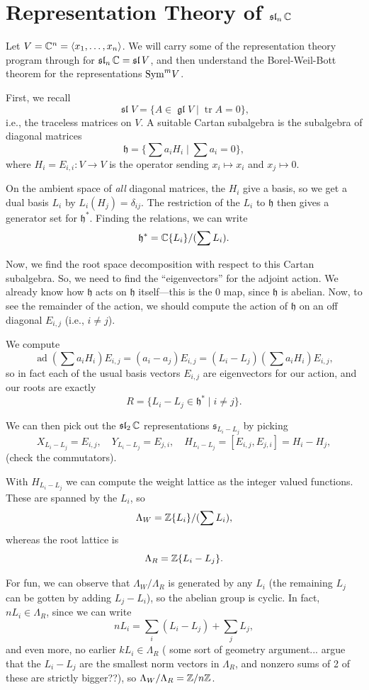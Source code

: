 \documentclass[12pt]{article}
\newcommand{\fh}{\mathfrak{h}}
\newcommand{\gl}{\operatorname{\mathfrak{gl}}}
\newcommand{\fs}{\mathfrak{s}}
\DeclareMathOperator{\ad}{ad}
\newcommand{\fsl}{\operatorname{\mathfrak{sl}}}
\DeclareMathOperator{\tr}{tr}
\begin{document}
\section{Representation Theory of $\fsl_n \C$}

Let $V=\mathbb{C}^n = \left\langle x_1,\dots,x_n\right\rangle$. We will carry some of the representation theory program through for $\fsl_n \C = \fsl V$, and then understand the Borel-Weil-Bott theorem for the representations $\mathrm{Sym}^m V$.

First, we recall
\[\fsl V = \{A\in \gl V \mid \tr A = 0\},\]
i.e., the traceless matrices on $V$. A suitable Cartan subalgebra is the subalgebra of diagonal matrices
\[\fh = \{\sum a_i H_i \mid \sum a_i = 0\},\]
where $H_i=E_{i,i}: V\to V$ is the operator sending $x_i\mapsto x_i$ and $x_j\mapsto 0$.

On the ambient space of \textit{all} diagonal matrices, the $H_i$ give a basis, so we get a dual basis $L_i$ by $L_i(H_j)=\delta_{ij}$. The restriction of the $L_i$ to $\fh$ then gives a generator set for $\fh^*$. Finding the relations, we can write
\[\fh^* = \C\{L_i\}/(\sum L_i).\]

Now, we find the root space decomposition with respect to this Cartan subalgebra. So, we need to find the ``eigenvectors'' for the adjoint action. We already know how $\fh$ acts on $\fh$ itself---this is the 0 map, since $\fh$ is abelian. Now, to see the remainder of the action, we should compute the action of $\fh$ on an off diagonal $E_{i,j}$ (i.e., $i\neq j$).

We compute
\[\ad(\sum a_i H_i) E_{i,j} = (a_i - a_j)E_{i,j} = (L_i - L_j)(\sum a_i H_i) E_{i,j},\]
so in fact each of the usual basis vectors $E_{i,j}$ are eigenvectors for our action, and our roots are exactly
\[R =\{ L_i - L_j \in \fh^* \mid i\neq j \}.\]

We can then pick out the $\fsl_2 \C$ representations $\fs_{L_i-L_j}$ by picking
\[X_{L_i - L_j} = E_{i,j}, \quad Y_{L_i - L_j} = E_{j,i}, \quad H_{L_i - L_j} = [E_{i,j},E_{j,i}] = H_i - H_j,\]
(check the commutators).

With $H_{L_i-L_j}$ we can compute the weight lattice as the integer valued functions. These are spanned by the $L_i$, so
\[\Lambda_W = \mathbb{Z}\{L_i\}/(\sum L_i),\]
whereas the root lattice is
\[\Lambda_R = \mathbb{Z}\{L_i - L_j\}.\]

For fun, we can observe that $\Lambda_W / \Lambda_R$ is generated by any $L_i$ (the remaining $L_j$ can be gotten by adding $L_j - L_i$), so the abelian group is cyclic. In fact, $nL_i \in \Lambda_R$, since we can write
\[nL_i = \sum_i (L_i - L_j) + \sum_j L_j,\]
and even more, no earlier $kL_i \in \Lambda_R$ ({\color{red} some sort of geometry argument... argue that the $L_i-L_j$ are the smallest norm vectors in $\Lambda_R$, and nonzero sums of 2 of these are strictly bigger??}), so $\Lambda_W/\Lambda_R=\mathbb{Z}/n\mathbb{Z}$.
\end{document}
